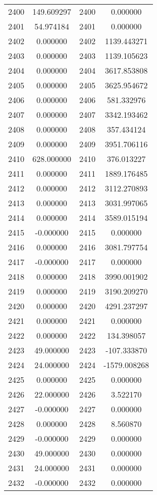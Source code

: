 \documentclass[12pt]{article}
\begin{document}
\begin{longtable}{@{}cccc@{}}
2400 & 149.609297 & 2400 & 0.000000 \\
2401 & 54.974184 & 2401 & 0.000000 \\
2402 & 0.000000 & 2402 & 1139.443271 \\
2403 & 0.000000 & 2403 & 1139.105623 \\
2404 & 0.000000 & 2404 & 3617.853808 \\
2405 & 0.000000 & 2405 & 3625.954672 \\
2406 & 0.000000 & 2406 & 581.332976 \\
2407 & 0.000000 & 2407 & 3342.193462 \\
2408 & 0.000000 & 2408 & 357.434124 \\
2409 & 0.000000 & 2409 & 3951.706116 \\
2410 & 628.000000 & 2410 & 376.013227 \\
2411 & 0.000000 & 2411 & 1889.176485 \\
2412 & 0.000000 & 2412 & 3112.270893 \\
2413 & 0.000000 & 2413 & 3031.997065 \\
2414 & 0.000000 & 2414 & 3589.015194 \\
2415 & -0.000000 & 2415 & 0.000000 \\
2416 & 0.000000 & 2416 & 3081.797754 \\
2417 & -0.000000 & 2417 & 0.000000 \\
2418 & 0.000000 & 2418 & 3990.001902 \\
2419 & 0.000000 & 2419 & 3190.209270 \\
2420 & 0.000000 & 2420 & 4291.237297 \\
2421 & 0.000000 & 2421 & 0.000000 \\
2422 & 0.000000 & 2422 & 134.398057 \\
2423 & 49.000000 & 2423 & -107.333870 \\
2424 & 24.000000 & 2424 & -1579.008268 \\
2425 & 0.000000 & 2425 & 0.000000 \\
2426 & 22.000000 & 2426 & 3.522170 \\
2427 & -0.000000 & 2427 & 0.000000 \\
2428 & 0.000000 & 2428 & 8.560870 \\
2429 & -0.000000 & 2429 & 0.000000 \\
2430 & 49.000000 & 2430 & 0.000000 \\
2431 & 24.000000 & 2431 & 0.000000 \\
2432 & -0.000000 & 2432 & 0.000000 \\

\end{longtable}
\end{document}
